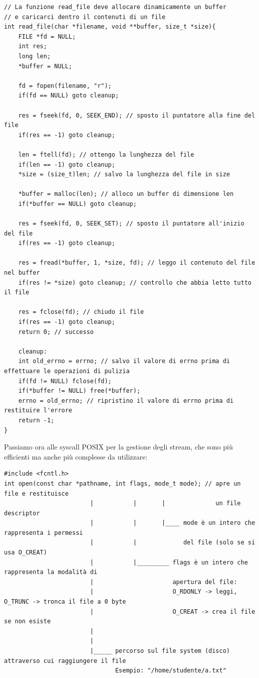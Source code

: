 \begin{verbatim}
// La funzione read_file deve allocare dinamicamente un buffer
// e caricarci dentro il contenuti di un file
int read_file(char *filename, void **buffer, size_t *size){
    FILE *fd = NULL;
    int res;
    long len;
    *buffer = NULL;

    fd = fopen(filename, "r");
    if(fd == NULL) goto cleanup;

    res = fseek(fd, 0, SEEK_END); // sposto il puntatore alla fine del file
    if(res == -1) goto cleanup;

    len = ftell(fd); // ottengo la lunghezza del file
    if(len == -1) goto cleanup;
    *size = (size_t)len; // salvo la lunghezza del file in size
    
    *buffer = malloc(len); // alloco un buffer di dimensione len
    if(*buffer == NULL) goto cleanup;

    res = fseek(fd, 0, SEEK_SET); // sposto il puntatore all'inizio del file
    if(res == -1) goto cleanup;

    res = fread(*buffer, 1, *size, fd); // leggo il contenuto del file nel buffer
    if(res != *size) goto cleanup; // controllo che abbia letto tutto il file

    res = fclose(fd); // chiudo il file
    if(res == -1) goto cleanup;
    return 0; // successo

    cleanup:
    int old_errno = errno; // salvo il valore di errno prima di effettuare le operazioni di pulizia
    if(fd != NULL) fclose(fd);
    if(*buffer != NULL) free(*buffer);
    errno = old_errno; // ripristino il valore di errno prima di restituire l'errore
    return -1;
}
\end{verbatim}
Passiamo ora alle syscall POSIX per la gestione degli stream, che sono più efficienti ma anche più complesse da utilizzare:
\begin{verbatim}
#include <fcntl.h>
int open(const char *pathname, int flags, mode_t mode); // apre un file e restituisce 
                        |           |       |              un file descriptor
                        |           |       |____ mode è un intero che rappresenta i permessi 
                        |           |             del file (solo se si usa O_CREAT)
                        |           |_________ flags è un intero che rappresenta la modalità di 
                        |                      apertura del file:
                        |                      O_RDONLY -> leggi, O_TRUNC -> tronca il file a 0 byte
                        |                      O_CREAT -> crea il file se non esiste
                        |                     
                        |                         
                        |_____ percorso sul file system (disco) attraverso cui raggiungere il file
                               Esempio: "/home/studente/a.txt"
\end{verbatim}
